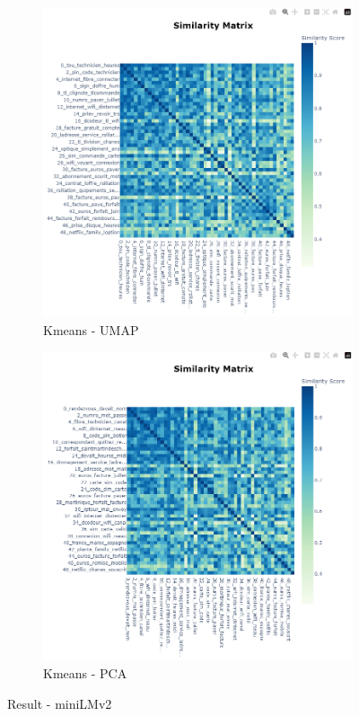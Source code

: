 \begin{figure}[H]
    \centering
    \begin{subfigure}{0.45\textwidth}
        \includegraphics[width=\linewidth]{images/results/mini/kmeans_umap.png}
        \caption{Kmeans - UMAP}
    \end{subfigure}
    \begin{subfigure}{0.45\textwidth}
        \includegraphics[width=\linewidth]{images/results/mini/kmeans_pca.png}
        \caption{Kmeans - PCA}
    \end{subfigure}
    \caption{Result - miniLMv2}
    \label{fig:result_mini_2}
\end{figure}


